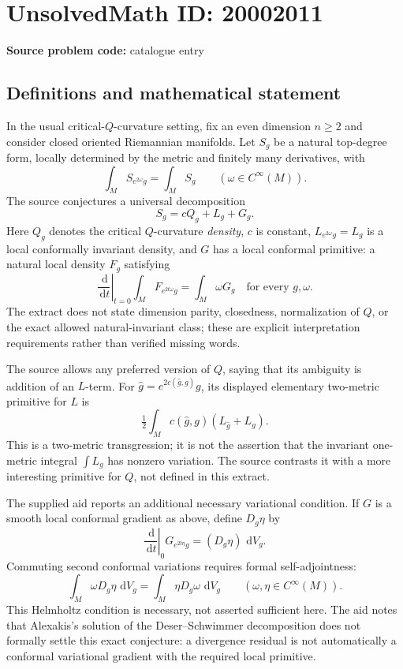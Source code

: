 \documentclass[11pt]{article}
\newcommand{\dd}{\,\mathrm{d}}
\begin{document}
\section*{UnsolvedMath ID: 20002011}
\textbf{Source problem code:} catalogue entry
\subsection{Definitions and mathematical statement}
In the usual critical-\(Q\)-curvature setting, fix an even dimension \(n\geq2\) and consider closed oriented Riemannian manifolds. Let \(S_g\) be a natural top-degree form, locally determined by the metric and finitely many derivatives, with
\[
\int_M S_{e^{2\omega}g}=\int_M S_g\qquad(\omega\in C^\infty(M)).
\]
The source conjectures a universal decomposition
\[
S_g=cQ_g+L_g+G_g.
\]
Here \(Q_g\) denotes the critical \(Q\)-curvature \emph{density}, \(c\) is constant, \(L_{e^{2\omega}g}=L_g\) is a local conformally invariant density, and \(G\) has a local conformal primitive: a natural local density \(F_g\) satisfying
\[
\left.\frac{\dd}{\dd t}\right|_{t=0}\int_M F_{e^{2t\omega}g}
=\int_M\omega G_g
\quad\text{for every }g,\omega.
\]
The extract does not state dimension parity, closedness, normalization of \(Q\), or the exact allowed natural-invariant class; these are explicit interpretation requirements rather than verified missing words.

The source allows any preferred version of \(Q\), saying that its ambiguity is addition of an \(L\)-term. For \(\widehat g=e^{2c(\widehat g,g)}g\), its displayed elementary two-metric primitive for \(L\) is
\[
\tfrac12\int_M c(\widehat g,g)(L_{\widehat g}+L_g).
\]
This is a two-metric transgression; it is not the assertion that the invariant one-metric integral \(\int L_g\) has nonzero variation. The source contrasts it with a more interesting primitive for \(Q\), not defined in this extract.

The supplied aid reports an additional necessary variational condition. If \(G\) is a smooth local conformal gradient as above, define \(D_g\eta\) by
\[
\left.\frac{\dd}{\dd t}\right|_{0}G_{e^{2t\eta}g}=(D_g\eta)\,\dd V_g.
\]
Commuting second conformal variations requires formal self-adjointness:
\[
\int_M\omega D_g\eta\,\dd V_g
=\int_M\eta D_g\omega\,\dd V_g\qquad(\omega,\eta\in C^\infty(M)).
\]
This Helmholtz condition is necessary, not asserted sufficient here. The aid notes that Alexakis's solution of the Deser--Schwimmer decomposition does not formally settle this exact conjecture: a divergence residual is not automatically a conformal variational gradient with the required local primitive.
\end{document}
